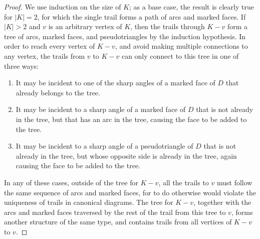 \documentclass{llncs}
\begin{document}
\begin{proof}
We use induction on the size of $K$; as a base case, the result is clearly true for $|K|=2$, for which the single trail forms a path of arcs and marked faces. If $|K|>2$ and $v$ is an arbitrary vertex of $K$, then the trails through $K-v$ form a tree of arcs, marked faces, and pseudotriangles by the induction hypothesis.
In order to reach every vertex of $K-v$, and avoid making multiple connections to any vertex, the trails from $v$ to $K-v$ can only connect to this tree in one of three ways:
\begin{enumerate}
\item It may be incident to one of the sharp angles of a marked face of $D$ that already belongs to  the tree.
\item It may be incident to a sharp angle of a marked face of $D$ that is not already in the tree, but that has an arc in the tree, causing the face to be added to the tree.
\item It may be incident to a sharp angle of a pseudotriangle of $D$ that is not already in the tree, but whose opposite side is already in the tree, again causing the face to be added to the tree.
\end{enumerate}
In any of these cases, outside of the tree for $K-v$, all the trails to $v$ must follow the same sequence of arcs and marked faces, for to do otherwise would violate the uniqueness of trails in canonical diagrams. The tree for $K-v$, together with the arcs and marked faces traversed by the rest of the trail from this tree to $v$, forms another structure of the same type, and contains trails from all vertices of $K-v$ to $v$.
\end{proof}
\end{document}
